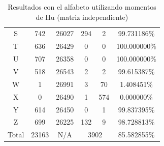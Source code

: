 \documentclass[a4paper, 11pt, oneside]{report}
\begin{document}
\begin{table}
\begin{tabular}{|c|c|c|c|c|c|}
	S & 742 & 26027 & 294 & 2 & 99.731186\% \\ 
	T & 636 & 26429 & 0 & 0 & 100.000000\% \\ 
	U & 707 & 26358 & 0 & 0 & 100.000000\% \\ 
	V & 518 & 26543 & 2 & 2 & 99.615387\% \\ 
	W & 1 & 26991 & 3 & 70 & 1.408451\% \\ 
	X & 0 & 26490 & 1 & 574 & 0.000000\% \\ 
	Y & 614 & 26450 & 0 & 1 & 99.837395\% \\ 
	Z & 699 & 26225 & 132 & 9 & 98.728813\% \\ 
	\hline
	Total & 23163 & N/A & \multicolumn{2}{|c|}{3902} & 85.582855\% \\
	\hline
\end{tabular}
\caption{Resultados con el alfabeto utilizando momentos de Hu (matriz independiente)}
\label{tb:alphaHuIndep}
\end{table}
\end{document}
